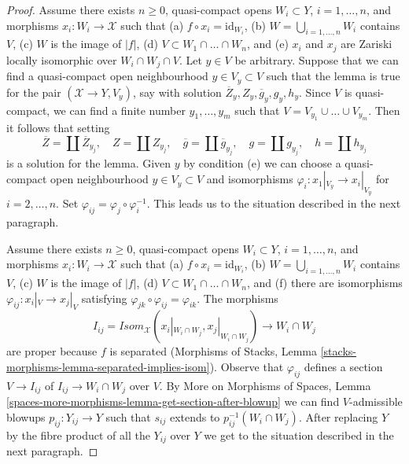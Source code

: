 \begin{proof}
\medskip\noindent
Assume there exists $n \geq 0$, quasi-compact opens
$W_i \subset Y$, $i = 1, \ldots, n$, and
morphisms $x_i : W_i \to \mathcal{X}$ such that
(a) $f \circ x_i = \text{id}_{W_i}$,
(b) $W = \bigcup_{i = 1, \ldots, n} W_i$ contains $V$,
(c) $W$ is the image of $|f|$,
(d) $V \subset W_1 \cap \ldots \cap W_n$, and
(e) $x_i$ and $x_j$ are Zariski locally isomorphic over $W_i \cap W_j \cap V$.
Let $y \in V$ be arbitrary.
Suppose that we can find a quasi-compact open neighbourhood
$y \in V_y \subset V$ such that the lemma is true for
the pair $(\mathcal{X} \to Y, V_y)$, say with solution
$\overline{Z}_y, Z_y, \overline{g}_y, g_y, h_y$.
Since $V$ is quasi-compact, we can find a finite number
$y_1, \ldots, y_m$ such that $V = V_{y_1} \cup \ldots \cup V_{y_m}$.
Then it follows that setting
$$
\overline{Z} = \coprod \overline{Z}_{y_j},\quad
Z = \coprod Z_{y_j},\quad
\overline{g} = \coprod \overline{g}_{y_j},\quad
g = \coprod g_{y_j},\quad
h = \coprod h_{y_j}
$$
is a solution for the lemma. Given $y$ by condition (e)
we can choose a quasi-compact open neighbourhood $y \in V_y \subset V$
and isomorphisms $\varphi_i : x_1|_{V_y} \to x_i|_{V_y}$ for
$i = 2, \ldots, n$. Set $\varphi_{ij} = \varphi_j \circ \varphi_i^{-1}$.
This leads us to the situation described in the next paragraph.

\medskip\noindent
Assume there exists $n \geq 0$, quasi-compact opens
$W_i \subset Y$, $i = 1, \ldots, n$, and
morphisms $x_i : W_i \to \mathcal{X}$ such that
(a) $f \circ x_i = \text{id}_{W_i}$,
(b) $W = \bigcup_{i = 1, \ldots, n} W_i$ contains $V$,
(c) $W$ is the image of $|f|$,
(d) $V \subset W_1 \cap \ldots \cap W_n$, and
(f) there are isomorphisms $\varphi_{ij} : x_i|_V \to x_j|_V$
satisfying $\varphi_{jk} \circ \varphi_{ij} = \varphi_{ik}$.
The morphisms
$$
I_{ij} = \mathit{Isom}_\mathcal{X}(x_i|_{W_i \cap W_j},
x_j|_{W_i \cap W_j}) \longrightarrow W_i \cap W_j
$$
are proper because $f$ is separated
(Morphisms of Stacks, Lemma
\ref{stacks-morphisms-lemma-separated-implies-isom}).
Observe that $\varphi_{ij}$ defines a section $V \to I_{ij}$
of $I_{ij} \to W_i \cap W_j$ over $V$.
By More on Morphisms of Spaces, Lemma
\ref{spaces-more-morphisms-lemma-get-section-after-blowup}
we can find $V$-admissible blowups
$p_{ij} : Y_{ij} \to Y$ such that $s_{ij}$
extends to $p_{ij}^{-1}(W_i \cap W_j)$.
After replacing $Y$ by the fibre product of all the $Y_{ij}$
over $Y$ we get to the situation described in the next paragraph.


\end{proof}
